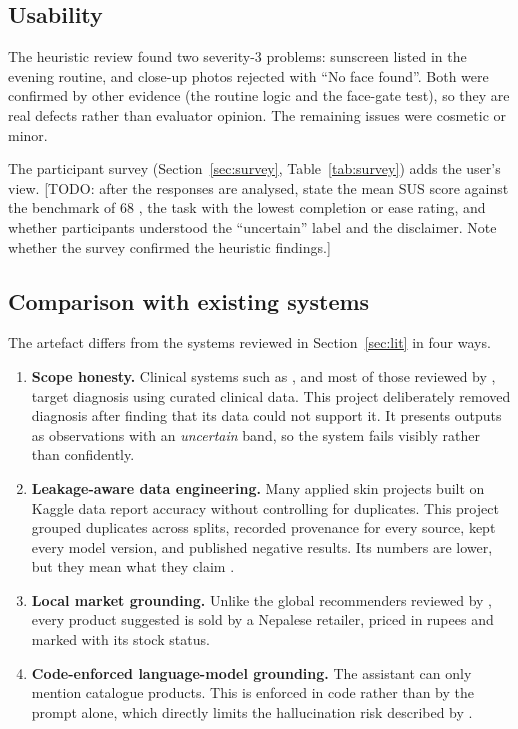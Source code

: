 \subsection*{Usability}

The heuristic review found two severity-3 problems: sunscreen listed in the evening routine, and close-up photos rejected with ``No face found''. Both were confirmed by other evidence (the routine logic and the face-gate test), so they are real defects rather than evaluator opinion. The remaining issues were cosmetic or minor.

The participant survey (Section~\ref{sec:survey}, Table~\ref{tab:survey}) adds the user's view. [TODO: after the responses are analysed, state the mean SUS score against the benchmark of 68 \citep{vlachogianni2022}, the task with the lowest completion or ease rating, and whether participants understood the ``uncertain'' label and the disclaimer. Note whether the survey confirmed the heuristic findings.]

\subsection*{Comparison with existing systems}

The artefact differs from the systems reviewed in Section~\ref{sec:lit} in four ways.

\begin{enumerate}
  \item \textbf{Scope honesty.} Clinical systems such as \citet{liu2020}, and most of those reviewed by \citet{jones2022}, target diagnosis using curated clinical data. This project deliberately removed diagnosis after finding that its data could not support it. It presents outputs as observations with an \emph{uncertain} band, so the system fails visibly rather than confidently.
  \item \textbf{Leakage-aware data engineering.} Many applied skin projects built on Kaggle data report accuracy without controlling for duplicates. This project grouped duplicates across splits, recorded provenance for every source, kept every model version, and published negative results. Its numbers are lower, but they mean what they claim \citep{kapoor2023}.
  \item \textbf{Local market grounding.} Unlike the global recommenders reviewed by \citet{ramrakhiani2024}, every product suggested is sold by a Nepalese retailer, priced in rupees and marked with its stock status.
  \item \textbf{Code-enforced language-model grounding.} The assistant can only mention catalogue products. This is enforced in code rather than by the prompt alone, which directly limits the hallucination risk described by \citet{ji2023}.
\end{enumerate}

